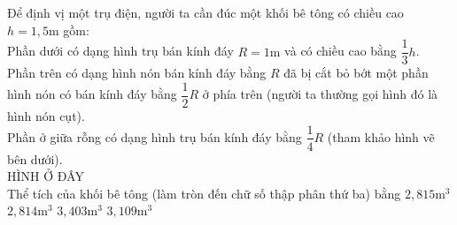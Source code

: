 \begin{ex}
	Để định vị một trụ điện, người ta cần đúc một khối bê tông có chiều cao $h=1,5\mathrm{m}$ gồm:\\
	Phần dưới có dạng hình trụ bán kính đáy $R=1\text{m}$ và có chiều cao bằng $\dfrac{1}{3}h$.\\
	Phần trên có dạng hình nón bán kính đáy bằng $R$ đã bị cắt bỏ bớt một phần hình nón có bán kính đáy bằng $\dfrac{1}{2}R$ ở phía trên (người ta thường gọi hình đó là hình nón cụt).\\
	Phần ở giữa rỗng có dạng hình trụ bán kính đáy bằng $\dfrac{1}{4}R$ (tham khảo hình vẽ bên dưới).\\
	{\color{red}HÌNH Ở ĐÂY}\\
	Thể tích của khối bê tông (làm tròn đến chữ số thập phân thứ ba) bằng
	\choice
	{$2,815\mathrm{m}^3$}
	{$2,814\mathrm{m}^3$}
	{$3,403\mathrm{m}^3$}
	{\True $3,109\mathrm{m}^3$}
\end{ex}       
